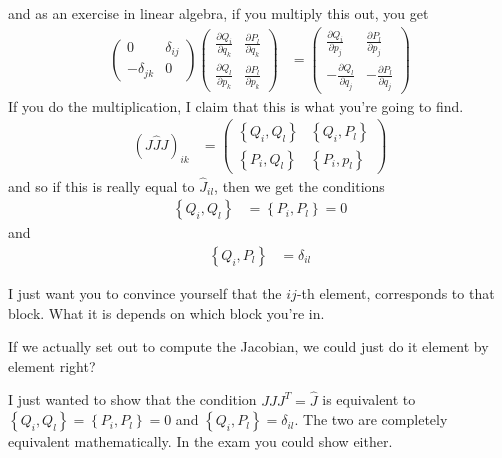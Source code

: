 and as an exercise in linear algebra,
if you multiply this out,
you get
\begin{align}
    \begin{pmatrix}
        0 & \delta_{ij}\\
        - \delta_{jk} & 0
    \end{pmatrix}
    \begin{pmatrix}
        \frac{\partial Q_i}{\partial q_k} &
        \frac{\partial P_l}{\partial q_k}\\
        \frac{\partial Q_l}{\partial p_k} &
        \frac{\partial P_l}{\partial p_k}
    \end{pmatrix}
    &=
    \begin{pmatrix}
        \frac{\partial Q_i}{\partial p_j} &
        \frac{\partial P_l}{\partial p_j}\\
        -\frac{\partial Q_l}{\partial q_j} &
        -\frac{\partial P_l}{\partial q_j}
    \end{pmatrix}
\end{align}
If you do the multiplication,
I claim that this is what you're going to find.
\begin{align}
    \left(J \hat{J} J\right)_{ik}
    &=
    \begin{pmatrix}
        \left\{ Q_i, Q_l \right\} &
        \left\{ Q_i, P_l \right\}\\
        \left\{ P_i, Q_l \right\} &
        \left\{ P_i, p_l \right\}
    \end{pmatrix}
\end{align}
and so if this is really equal to $\hat{J}_{il}$,
then we get the conditions
\begin{align}
    \left\{ Q_i, Q_l \right\} &=
    \left\{ P_i, P_l \right\} = 0
\end{align}
and
\begin{align}
    \left\{ Q_i, P_l \right\} &= \delta_{il}
\end{align}

I just want you to convince yourself that the $ij$-th element,
corresponds to that block.
What it is depends on which block you're in.

\begin{question}
    If we actually set out to compute the Jacobian,
    we could just do it element by element right?
\end{question}
I just wanted to show that the condition
$J \hat{J} J^T = \hat{J}$
is equivalent to
$\left\{ Q_i, Q_l \right\} = \left\{ P_i, P_l \right\} = 0$
and
$\left\{ Q_i, P_l \right\} = \delta_{il}$.
The two are completely equivalent mathematically.
In the exam you could show either.

